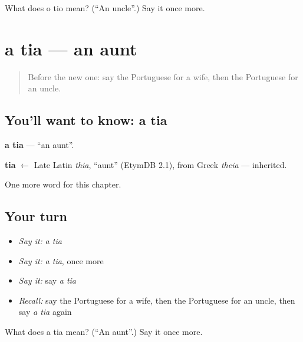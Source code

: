 \begin{tcolorbox}[breakable,colback=teal!4,colframe=teal!35!black,title={Before you move on}]
What does o tio mean? (\textquotedblleft{}An uncle\textquotedblright{}.) Say it once more.
\end{tcolorbox}
\section[a tia]{a tia — an aunt}

\label{lesson:PT-C38-tia}



\begin{quote}
Before the new one: say the Portuguese for a wife, then the Portuguese for an uncle.
\end{quote}

\subsection*{You'll want to know: a tia}
\textbf{a tia} — \textquotedblleft{}an aunt\textquotedblright{}.

\begin{cousinweb}
\textbf{tia} $\leftarrow$ Late Latin \emph{thia}, \textquotedblleft{}aunt\textquotedblright{} (EtymDB 2.1), from Greek \emph{theia} — inherited.
\end{cousinweb}

\begin{grammarlens}[title={What you've built}]
One more word for this chapter.
\end{grammarlens}

\subsection*{Your turn}
\begin{itemize}
\raggedright
  \item \emph{Say it:} \emph{a tia}
  \item \emph{Say it:} \emph{a tia}, once more
  \item \emph{Say it:} say \emph{a tia}
  \item \emph{Recall:} say the Portuguese for a wife, then the Portuguese for an uncle, then say \emph{a tia} again
\end{itemize}

\begin{tcolorbox}[breakable,colback=teal!4,colframe=teal!35!black,title={Before you move on}]
What does a tia mean? (\textquotedblleft{}An aunt\textquotedblright{}.) Say it once more.
\end{tcolorbox}
